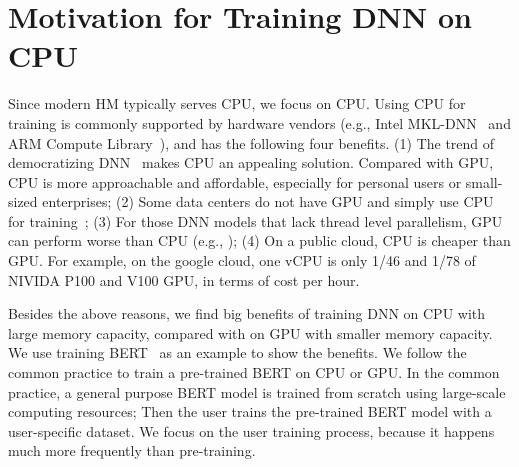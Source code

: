 \section{Motivation for Training DNN on CPU}

\textcolor{check}{Since modern HM typically serves CPU, we focus on CPU. Using CPU for training is commonly supported by hardware vendors (e.g., Intel MKL-DNN~\cite{intelMKL} and ARM Compute Library~\cite{arm_cl}), and has the following four benefits. (1) The trend of democratizing DNN~\cite{democratization_ai} makes CPU an appealing solution. Compared with GPU, CPU is more approachable and affordable, especially for personal users or small-sized enterprises; (2) Some data centers do not have GPU and simply use CPU for training~\cite{lbnl_cori, tacc_stampede, 8658402, Kurth:2018:EDL:3291656.3291724, Mathuriya:2018:CUD:3291656.3291743,  tacc_ml_CPU_training}; (3) For those DNN models that lack thread level parallelism, GPU can perform worse than CPU (e.g., \cite{DBLP:journals/corr/ChengKHSCAACCIA16, Hasselt:2016:DRL:3016100.3016191,mlsys19:chen});  
(4) On a public cloud, CPU is cheaper than GPU. For example, on the google cloud, one vCPU is only 1/46 and 1/78 of NIVIDA P100 and V100 GPU, in terms of cost per hour.} %



\textcolor{check}{Besides the above reasons, we find big benefits of training DNN on CPU with large memory capacity, compared with on GPU with smaller memory capacity. We use training BERT~\cite{devlin2018bert} as an example to show the benefits. We follow the common practice to train a pre-trained BERT on CPU or GPU. In the common practice, a general purpose BERT model is trained from scratch using large-scale computing resources; Then the user trains the pre-trained BERT model with a user-specific dataset. We focus on the user training process, because it happens much more frequently than pre-training.}

